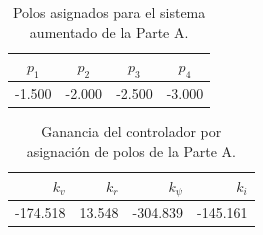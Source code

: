 \begin{table}[H]
\centering
\caption{Polos asignados para el sistema aumentado de la Parte A.}
\label{tab:parte-a-polos}
\begin{tabular}{cccc}
\toprule
$p_1$ & $p_2$ & $p_3$ & $p_4$ \\
\midrule
-1.500 & -2.000 & -2.500 & -3.000 \\
\bottomrule
\end{tabular}
\end{table}

\begin{table}[H]
\centering
\caption{Ganancia del controlador por asignación de polos de la Parte A.}
\label{tab:parte-a-ganancias}
\begin{tabular}{rrrr}
\toprule
$k_v$ & $k_r$ & $k_\psi$ & $k_i$ \\
\midrule
-174.518 & 13.548 & -304.839 & -145.161 \\
\bottomrule
\end{tabular}
\end{table}
